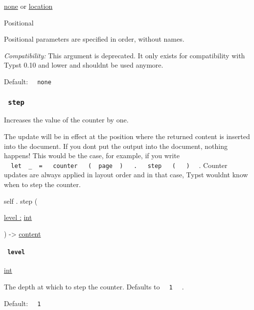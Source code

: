 \href{/docs/reference/foundations/none/}{none} {or}
\href{/docs/reference/introspection/location/}{location}

{{ Positional }}

\label{definitions-final-location-positional-tooltip}
Positional parameters are specified in order, without names.

\emph{Compatibility:} This argument is deprecated. It only exists for
compatibility with Typst 0.10 and lower and shouldn\textquotesingle t be
used anymore.

Default: \texttt{\ }{\texttt{\ none\ }}\texttt{\ }

\subsubsection{\texorpdfstring{\texttt{\ step\ }}{ step }}\label{definitions-step}

Increases the value of the counter by one.

The update will be in effect at the position where the returned content
is inserted into the document. If you don\textquotesingle t put the
output into the document, nothing happens! This would be the case, for
example, if you write
\texttt{\ }{\texttt{\ let\ }}\texttt{\ \_\ }{\texttt{\ =\ }}\texttt{\ }{\texttt{\ counter\ }}\texttt{\ }{\texttt{\ (\ }}\texttt{\ page\ }{\texttt{\ )\ }}\texttt{\ }{\texttt{\ .\ }}\texttt{\ }{\texttt{\ step\ }}\texttt{\ }{\texttt{\ (\ }}\texttt{\ }{\texttt{\ )\ }}\texttt{\ }
. Counter updates are always applied in layout order and in that case,
Typst wouldn\textquotesingle t know when to step the counter.

self { . } { step } (

{ \hyperref[definitions-step-parameters-level]{level :}
\href{/docs/reference/foundations/int/}{int} }

) -\textgreater{} \href{/docs/reference/foundations/content/}{content}

\paragraph{\texorpdfstring{\texttt{\ level\ }}{ level }}\label{definitions-step-level}

\href{/docs/reference/foundations/int/}{int}

The depth at which to step the counter. Defaults to
\texttt{\ }{\texttt{\ 1\ }}\texttt{\ } .

Default: \texttt{\ }{\texttt{\ 1\ }}\texttt{\ }

